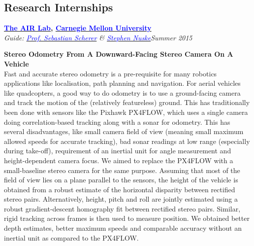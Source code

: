 \documentclass[margin,line]{res}
\newenvironment{list1}{
  \begin{list}{\ding{113}}{%
      \setlength{\itemsep}{0in}
      \setlength{\parsep}{0in} \setlength{\parskip}{0in}
      \setlength{\topsep}{0in} \setlength{\partopsep}{0in} 
      \setlength{\leftmargin}{0.17in}}}{\end{list}}
\begin{document}
\begin{resume}
\section{\sc Research Internships} 

{\bf  \href{http://theairlab.org/}{\textcolor{blue}{The AIR Lab}}, \href{http://www.cmu.edu/}{\textcolor{blue}{Carnegie Mellon University}}} \\
{\em Guide: \href{http://www.ri.cmu.edu/person.html?person_id=1397}{\textcolor{blue}{Prof. Sebastian Scherer}} \& \href{http://www.ri.cmu.edu/person.html?person_id=2128}{\textcolor{blue} {Stephen Nuske}}}\hfill\textit{Summer 2015} \\
\vspace*{-.13in}
\begin{list1}
\item[]\textbf{Stereo Odometry From A Downward-Facing Stereo Camera On A Vehicle} \\
Fast and accurate stereo odometry is a pre-requisite for many robotics applications like localisation, path planning and navigation. For aerial vehicles like quadcopters, a good way to do odometry is to use a ground-facing camera and track the motion of the (relatively featureless) ground. This has traditionally been done with sensors like the Pixhawk PX4FLOW, which uses a single camera doing correlation-based tracking along with a sonar for odometry. This has several disadvantages, like small camera field of view (meaning small maximum allowed speeds for accurate tracking), bad sonar readings at low range (especially during take-off), requirement of an inertial unit for angle measurement and height-dependent camera focus. We aimed to replace the PX4FLOW with a small-baseline stereo camera for the same purpose. Assuming that most of the field of view lies on a plane parallel to the sensors, the height of the vehicle is obtained from a robust estimate of the horizontal disparity between rectified stereo pairs. Alternatively, height, pitch and roll are jointly estimated using a robust gradient-descent homography fit between rectified stereo pairs. Similar, rigid tracking across frames is then used to measure position. We obtained better depth estimates, better maximum speeds and comparable accuracy without an inertial unit as compared to the PX4FLOW.
\end{list1}


\end{resume}
\end{document}
